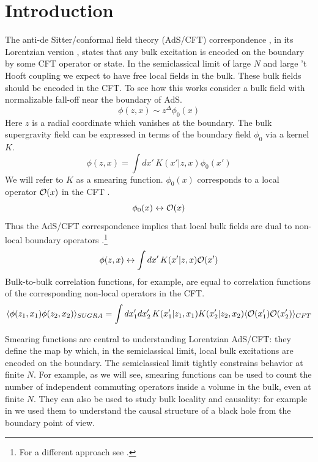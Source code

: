 \documentclass[12pt]{article}
\begin{document}
\section{Introduction}

The anti-de Sitter/conformal field theory (AdS/CFT) correspondence
\cite{Maldacena:1997re,Gubser:1998bc,Witten:1998qj,Aharony:1999ti}, in
its Lorentzian version
\cite{Balasubramanian:1998sn,Banks:1998dd,Balasubramanian:1998de},
states that any bulk excitation is encoded on the boundary by some CFT
operator or state. In the semiclassical limit of large $N$ and large
't Hooft coupling we expect to have free local fields in the
bulk. These bulk fields should be encoded in the CFT.  To see how this
works consider a bulk field with normalizable fall-off near the
boundary of AdS.
\[
\phi(z,x) \sim z^\Delta \phi_0(x)
\]
Here $z$ is a radial coordinate which vanishes at the boundary.  The
bulk supergravity field can be expressed in terms of the boundary
field $\phi_0$ via a kernel $K$.
\[
\phi(z,x) = \int dx' \, K(x' \vert z,x) \phi_0(x')
\]
We will refer to $K$ as a smearing function.  $\phi_0(x)$ corresponds
to a local operator ${\cal O}(x)$ in the CFT \cite{Klebanov:1999tb}.
\[
\phi_0(x) \leftrightarrow {\cal O}(x)
\]
Thus the AdS/CFT correspondence implies that local bulk fields are
dual to non-local boundary operators
\cite{Banks:1998dd,Balasubramanian:1999ri,Bena}.\footnote{For a
different approach see \cite{Rehren:1999jn,Rehren:2000tp}.}
\begin{equation}
\phi(z,x) \leftrightarrow \int dx' \, K(x' \vert z,x){\cal O}(x')
\label{basic}
\end{equation} 
Bulk-to-bulk correlation functions, for example, are equal to
correlation functions of the corresponding non-local operators in the
CFT.
\[
\langle \phi(z_1,x_1) \phi(z_2,x_2) \rangle_{SUGRA} = \int dx_1' dx_2' \,
K(x_1' \vert z_1,x_1) K(x_2' \vert z_2,x_2) \langle {\cal O}(x_1')
{\cal O}(x_2') \rangle_{CFT}
\]

Smearing functions are central to understanding Lorentzian AdS/CFT:
they define the map by which, in the semiclassical limit, local bulk
excitations are encoded on the boundary.  The semiclassical limit
tightly constrains behavior at finite $N$.  For example, as we will
see, smearing functions can be used to count the number of independent
commuting operators inside a volume in the bulk, even at finite $N$.
They can also be used to study bulk locality and causality: for
example in \cite{hkll} we used them to understand the causal structure
of a black hole from the boundary point of view.
\end{document}
